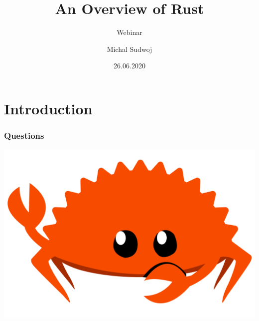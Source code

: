 \documentclass[aspectratio=43, t]{beamer}
\author{Michal Sudwoj}
\title{An Overview of Rust}
\subtitle{Webinar}
\date{26.06.2020}
\begin{document}
\renewcommand{\fcolorbox}[4][]{#4}

\begin{frame}[plain, c]
	\titlepage
\end{frame}

\section*{Introduction}

\begin{frame}
	\frametitle{Questions}

	\includegraphics[width = \textwidth, height = \textheight, keepaspectratio]{rustacean-flat-gesture}
\end{frame}
\end{document}
